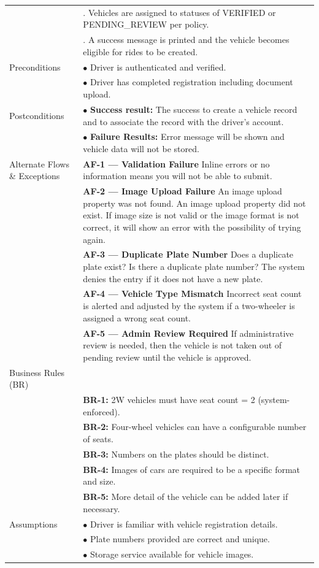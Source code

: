 \begin{longtable}{|>{\raggedright\arraybackslash}p{4cm}|>{\raggedright\arraybackslash}p{11cm}|}
& 7. Vehicles are assigned to statuses of VERIFIED or PENDING_REVIEW per policy. \\
& 8. A success message is printed and the vehicle becomes eligible for rides to be created. \\
\hline
Preconditions & $\bullet$ Driver is authenticated and verified. \\
& $\bullet$ Driver has completed registration including document upload. \\
\hline
Postconditions & $\bullet$ \textbf{Success result:} The success to create a vehicle record and to associate the record with the driver's account. \\
& $\bullet$ \textbf{Failure Results:} Error message will be shown and vehicle data will not be stored. \\
\hline
Alternate Flows \& Exceptions & \textbf{AF-1 — Validation Failure} \newline Inline errors or no information means you will not be able to submit. \\
& \textbf{AF-2 — Image Upload Failure} \newline An image upload property was not found. An image upload property did not exist. If image size is not valid or the image format is not correct, it will show an error with the possibility of trying again. \\
& \textbf{AF-3 — Duplicate Plate Number} \newline Does a duplicate plate exist? Is there a duplicate plate number? The system denies the entry if it does not have a new plate. \\
& \textbf{AF-4 — Vehicle Type Mismatch} \newline Incorrect seat count is alerted and adjusted by the system if a two-wheeler is assigned a wrong seat count. \\
& \textbf{AF-5 — Admin Review Required} \newline If administrative review is needed, then the vehicle is not taken out of pending review until the vehicle is approved. \\
\hline
Business Rules (BR) & \\
& \textbf{BR-1:} 2W vehicles must have seat count = 2 (system-enforced). \\
& \textbf{BR-2:} Four-wheel vehicles can have a configurable number of seats. \\
& \textbf{BR-3:} Numbers on the plates should be distinct. \\
& \textbf{BR-4:} Images of cars are required to be a specific format and size. \\
& \textbf{BR-5:} More detail of the vehicle can be added later if necessary. \\
\hline
Assumptions & $\bullet$ Driver is familiar with vehicle registration details. \\
& $\bullet$ Plate numbers provided are correct and unique. \\
& $\bullet$ Storage service available for vehicle images. \\
\end{longtable}

